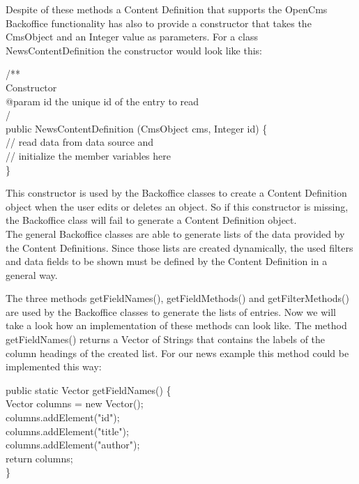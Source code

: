 Despite of these methods a Content Definition that supports the OpenCms
Backoffice functionality has also to provide a constructor that takes the
{\class CmsObject} and an Integer value as parameters. For a class NewsContentDefinition
the constructor would look like this:

\begin{java}
\jtaba        /**\\
\jtaba \xspace * Constructor\\
\jtaba \xspace * @param id the unique id of the entry to read\\
\jtaba \xspace */\\
\jtaba public NewsContentDefinition (CmsObject cms, Integer id) \{\\
\jtabb  // read data from data source and\\
\jtabb  // initialize the member variables here\\
\jtaba \}\\
\end{java}

This constructor is used by the Backoffice classes to create a Content
Definition object when the user edits or deletes an object. So if this
constructor is missing, the Backoffice class will fail to generate a
Content Definition object.\\
The general Backoffice classes are able to generate lists of the data
provided by the Content Definitions.  Since those lists are created
dynamically, the used filters and data fields to be shown must be
defined by the Content Definition in a general way.

The three methods {\meth getFieldNames()}, {\meth getFieldMethods()} and
{\meth getFilterMethods()} are used by the Backoffice classes to generate
the lists of entries. Now we will take a look how an implementation
of these methods can look like. The method 
{\meth getFieldNames()} returns a Vector of Strings that contains the labels 
of the column headings of the created list.
For our news example this method could be implemented this way:

\begin{java}
\jtaba public static Vector getFieldNames() \{\\
\jtabb Vector columns = new Vector();\\
\jtabb columns.addElement("id");\\
\jtabb columns.addElement("title");\\
\jtabb columns.addElement("author");\\
\jtabb return columns;\\
\jtaba \}\\
\end{java}

